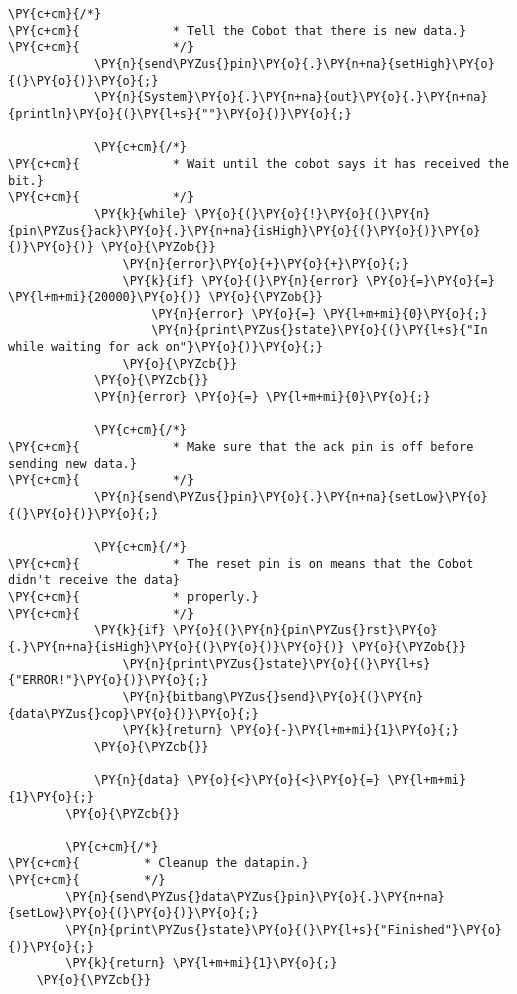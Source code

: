 \begin{Verbatim}[commandchars=\\\{\}]
            \PY{c+cm}{/*}
\PY{c+cm}{             * Tell the Cobot that there is new data.}
\PY{c+cm}{             */}
            \PY{n}{send\PYZus{}pin}\PY{o}{.}\PY{n+na}{setHigh}\PY{o}{(}\PY{o}{)}\PY{o}{;}
            \PY{n}{System}\PY{o}{.}\PY{n+na}{out}\PY{o}{.}\PY{n+na}{println}\PY{o}{(}\PY{l+s}{""}\PY{o}{)}\PY{o}{;}

            \PY{c+cm}{/*}
\PY{c+cm}{             * Wait until the cobot says it has received the bit.}
\PY{c+cm}{             */}
            \PY{k}{while} \PY{o}{(}\PY{o}{!}\PY{o}{(}\PY{n}{pin\PYZus{}ack}\PY{o}{.}\PY{n+na}{isHigh}\PY{o}{(}\PY{o}{)}\PY{o}{)}\PY{o}{)} \PY{o}{\PYZob{}}
                \PY{n}{error}\PY{o}{+}\PY{o}{+}\PY{o}{;}
                \PY{k}{if} \PY{o}{(}\PY{n}{error} \PY{o}{=}\PY{o}{=} \PY{l+m+mi}{20000}\PY{o}{)} \PY{o}{\PYZob{}}
                    \PY{n}{error} \PY{o}{=} \PY{l+m+mi}{0}\PY{o}{;}
                    \PY{n}{print\PYZus{}state}\PY{o}{(}\PY{l+s}{"In while waiting for ack on"}\PY{o}{)}\PY{o}{;}
                \PY{o}{\PYZcb{}}
            \PY{o}{\PYZcb{}}
            \PY{n}{error} \PY{o}{=} \PY{l+m+mi}{0}\PY{o}{;}

            \PY{c+cm}{/*}
\PY{c+cm}{             * Make sure that the ack pin is off before sending new data.}
\PY{c+cm}{             */}
            \PY{n}{send\PYZus{}pin}\PY{o}{.}\PY{n+na}{setLow}\PY{o}{(}\PY{o}{)}\PY{o}{;}

            \PY{c+cm}{/*}
\PY{c+cm}{             * The reset pin is on means that the Cobot didn't receive the data}
\PY{c+cm}{             * properly.}
\PY{c+cm}{             */}
            \PY{k}{if} \PY{o}{(}\PY{n}{pin\PYZus{}rst}\PY{o}{.}\PY{n+na}{isHigh}\PY{o}{(}\PY{o}{)}\PY{o}{)} \PY{o}{\PYZob{}}
                \PY{n}{print\PYZus{}state}\PY{o}{(}\PY{l+s}{"ERROR!"}\PY{o}{)}\PY{o}{;}
                \PY{n}{bitbang\PYZus{}send}\PY{o}{(}\PY{n}{data\PYZus{}cop}\PY{o}{)}\PY{o}{;}
                \PY{k}{return} \PY{o}{-}\PY{l+m+mi}{1}\PY{o}{;}
            \PY{o}{\PYZcb{}}

            \PY{n}{data} \PY{o}{<}\PY{o}{<}\PY{o}{=} \PY{l+m+mi}{1}\PY{o}{;}
        \PY{o}{\PYZcb{}}

        \PY{c+cm}{/*}
\PY{c+cm}{         * Cleanup the datapin.}
\PY{c+cm}{         */}
        \PY{n}{send\PYZus{}data\PYZus{}pin}\PY{o}{.}\PY{n+na}{setLow}\PY{o}{(}\PY{o}{)}\PY{o}{;}
        \PY{n}{print\PYZus{}state}\PY{o}{(}\PY{l+s}{"Finished"}\PY{o}{)}\PY{o}{;}
        \PY{k}{return} \PY{l+m+mi}{1}\PY{o}{;}
    \PY{o}{\PYZcb{}}


\end{Verbatim}
